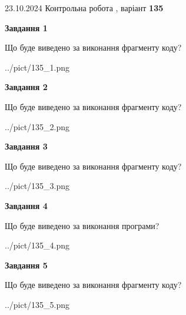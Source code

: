 \documentclass[12pt, ukrainian]{article}
\begin{document}
{\Large{23.10.2024 Контрольна робота , варіант  \No \textbf { 135 }\par}}
{
\begin {large}
{\begin {center}\textbf{Завдання 1}\end {center}}

Що буде виведено за виконання фрагменту коду?\par
\begin{center}
	{../pict/135_1.png}
\end{center}
\newpage

{\begin {center}\textbf{Завдання 2}\end {center}}

Що буде виведено за виконання фрагменту коду?\par
\begin{center}
	{../pict/135_2.png}
\end{center}
\newpage

{\begin {center}\textbf{Завдання 3}\end {center}}

Що буде виведено за виконання фрагменту коду?\par
\begin{center}
	{../pict/135_3.png}
\end{center}
\newpage

{\begin {center}\textbf{Завдання 4}\end {center}}

Що буде виведено за виконання програми?\par
\begin{center}
	{../pict/135_4.png}
\end{center}
\newpage

{\begin {center}\textbf{Завдання 5}\end {center}}

Що буде виведено за виконання фрагменту коду?\par
\begin{center}
	{../pict/135_5.png}
\end{center}
\newpage


\end{large}}
\end{document}
